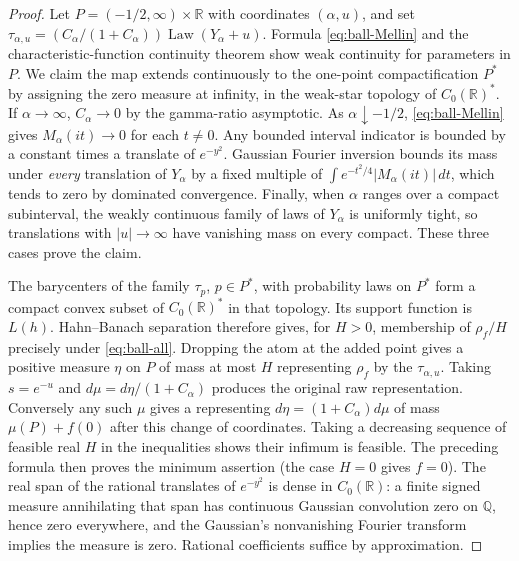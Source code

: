 \documentclass[11pt,a4paper]{article}
\numberwithin{equation}{section}
\begin{document}
\begin{proof}
Let $P=(-1/2,\infty)\times\mathbb R$ with coordinates $(\alpha,u)$,
and set $\tau_{\alpha,u}=(C_\alpha/(1+C_\alpha))
\operatorname{Law}(Y_\alpha+u)$. Formula \eqref{eq:ball-Mellin} and
the characteristic-function continuity theorem show weak continuity
for parameters in $P$. We claim the map extends continuously to the
one-point compactification $P^*$ by assigning the zero measure at infinity,
in the weak-star topology of $C_0(\mathbb R)^*$. If $\alpha\to\infty$,
$C_\alpha\to0$ by the gamma-ratio asymptotic. As
$\alpha\downarrow-1/2$, \eqref{eq:ball-Mellin} gives
$M_\alpha(it)\to0$ for each $t\ne0$. Any bounded interval indicator is
bounded by a constant times a translate of $e^{-y^2}$. Gaussian Fourier
inversion bounds its mass under \emph{every} translation of $Y_\alpha$
by a fixed multiple of
$\int e^{-t^2/4}|M_\alpha(it)|\,dt$, which tends to zero by dominated
convergence. Finally, when $\alpha$ ranges over a compact subinterval,
the weakly continuous family of laws of $Y_\alpha$ is uniformly tight,
so translations with $|u|\to\infty$ have vanishing mass on every compact.
These three cases prove the claim.

The barycenters of the family $\tau_p$, $p\in P^*$, with probability
laws on $P^*$ form a compact convex subset of $C_0(\mathbb R)^*$ in
that topology. Its support function is $L(h)$. Hahn--Banach separation
therefore gives, for $H>0$, membership of $\rho_f/H$ precisely under
\eqref{eq:ball-all}. Dropping the atom at the added point gives a positive
measure $\eta$ on $P$ of mass at most $H$ representing $\rho_f$ by
the $\tau_{\alpha,u}$. Taking $s=e^{-u}$ and
$d\mu=d\eta/(1+C_\alpha)$ produces the original raw representation.
Conversely any such $\mu$ gives a representing
$d\eta=(1+C_\alpha)d\mu$ of mass $\mu(P)+f(0)$ after this change of
coordinates. Taking a decreasing sequence of feasible real $H$ in the
inequalities shows their infimum is feasible. The preceding formula
then proves the minimum assertion (the case $H=0$ gives $f=0$).
The real span of the rational translates of $e^{-y^2}$ is dense in
$C_0(\mathbb R)$: a finite signed measure annihilating that span
has continuous Gaussian convolution zero on $\mathbb Q$, hence zero
everywhere, and the Gaussian's nonvanishing Fourier transform implies
the measure is zero. Rational coefficients suffice by approximation.
\end{proof}
\end{document}
